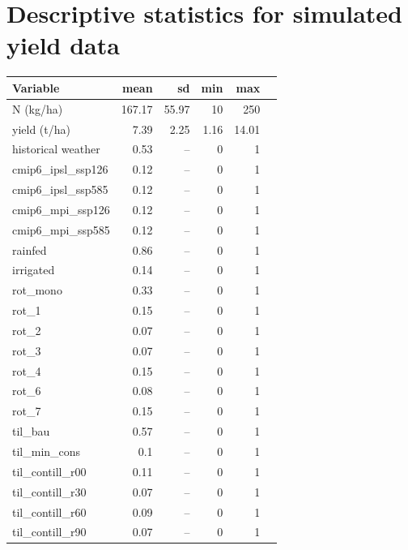 \documentclass[12pt,a4paper]{article}
\begin{document}
\newpage
\appendix

\section{Descriptive statistics for simulated yield data}
\label{annex:yield}

\begin{table}[H]
\centering
\footnotesize
\begin{tabular}{lrrrrr}
\toprule
Variable & mean & sd & min & max \\
\midrule
N (kg/ha) & 167.17 & 55.97 & 10 & 250 \\
yield (t/ha) & 7.39 & 2.25 & 1.16 & 14.01 \\
historical weather & 0.53 & -- & 0 & 1 \\
cmip6\_ipsl\_ssp126 & 0.12 & -- & 0 & 1 \\
cmip6\_ipsl\_ssp585 & 0.12 & -- & 0 & 1 \\
cmip6\_mpi\_ssp126 & 0.12 & -- & 0 & 1 \\
cmip6\_mpi\_ssp585 & 0.12 & -- & 0 & 1 \\
rainfed & 0.86 & -- & 0 & 1 \\
irrigated & 0.14 & -- & 0 & 1 \\
rot\_mono & 0.33 & -- & 0 & 1 \\
rot\_1 & 0.15 & -- & 0 & 1 \\
rot\_2 & 0.07 & -- & 0 & 1 \\
rot\_3 & 0.07 & -- & 0 & 1 \\
rot\_4 & 0.15 & -- & 0 & 1 \\
rot\_6 & 0.08 & -- & 0 & 1 \\
rot\_7 & 0.15 & -- & 0 & 1 \\
til\_bau & 0.57 & -- & 0 & 1 \\
til\_min\_cons & 0.1 & -- & 0 & 1 \\
til\_contill\_r00 & 0.11 & -- & 0 & 1 \\
til\_contill\_r30 & 0.07 & -- & 0 & 1 \\
til\_contill\_r60 & 0.09 & -- & 0 & 1 \\
til\_contill\_r90 & 0.07 & -- & 0 & 1 \\
\bottomrule
\end{tabular}
\end{table}
\end{document}
